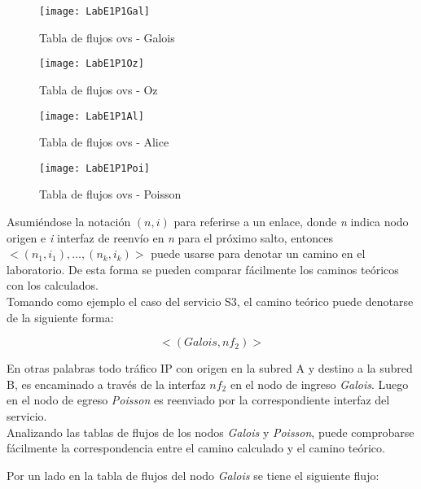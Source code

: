 \newpage
\begin{figure}[ht!] 
\centering    
\texttt{[image: LabE1P1Gal]}
\caption[Tabla de flujos ovs - Galois]{Tabla de flujos ovs - Galois}
\label{fig:CU1P1DumpFlows1}
\end{figure}

\begin{figure}[h!] 
\centering    
\texttt{[image: LabE1P1Oz]}
\caption[Tabla de flujos ovs - Oz]{Tabla de flujos ovs - Oz}
\label{fig:CU1P1DumpFlows2}
\end{figure}

\begin{figure}[h!] 
\centering    
\texttt{[image: LabE1P1Al]}
\caption[Tabla de flujos ovs - Alice]{Tabla de flujos ovs - Alice}
\label{fig:CU1P1DumpFlows3}
\end{figure}

\begin{figure}[h!] 
\centering    
\texttt{[image: LabE1P1Poi]}
\caption[Tabla de flujos ovs - Poisson]{Tabla de flujos ovs - Poisson}
\label{fig:CU1P1DumpFlows4}
\end{figure}

\newpage
Asumiéndose la notaci\'on $(n, i)$ para referirse a un enlace, donde \textit{n} indica nodo origen e \textit{i} interfaz de reenvío en \textit{n} para el próximo salto, entonces $<(n_1, i_1), \dots, (n_k, i_k)>$ puede usarse para denotar un camino en el laboratorio. De esta forma se pueden comparar f\'acilmente los caminos te\'oricos con los calculados.\\

Tomando como ejemplo el caso del servicio S3, el camino te\'orico puede denotarse de la siguiente forma:
 
$$<(Galois, nf_2)>$$

En otras palabras todo tr\'afico IP con origen en la subred A y destino a la subred B, es encaminado a través de la interfaz $nf_2$ en el nodo de ingreso \textit{Galois}. Luego en el nodo de egreso \textit{Poisson} es reenviado por la correspondiente interfaz del servicio.\\

Analizando las tablas de flujos de los nodos \textit{Galois} y \textit{Poisson}, puede comprobarse fácilmente la correspondencia entre el camino calculado y el camino te\'orico.

Por un lado en la tabla de flujos del nodo \textit{Galois} se tiene el siguiente flujo:

